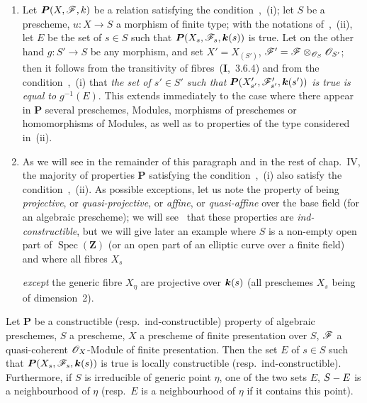 \begin{remarks}[9.2.2]
\begin{enumerate}[label=(\roman*)]
  \item Let $\boldsymbol{P}(X,\mathscr{F},k)$ be a relation satisfying the condition~,~(i); let $S$ be a prescheme, $u:X\to S$ a morphism of finite type; with the notations of~,~(ii), let $E$ be the set of $s\in S$ such that $\boldsymbol{P}(X_s,\mathscr{F}_s,\boldsymbol{k}(s))$ is true.
Let on the other hand $g:S'\to S$ be any morphism, and set $X'=X_{(S')}$, $\mathscr{F}'=\mathscr{F}\otimes_{\mathscr{O}_S}\mathscr{O}_{S'}$; then it follows from the transitivity of fibres~(\textbf{I},~3.6.4) and from the condition~,~(i) that \emph{the set of $s'\in S'$ such that $\boldsymbol{P}(X'_{s'},\mathscr{F}'_{s'},\boldsymbol{k}(s'))$ is true is equal to $g^{-1}(E)$}.
This extends immediately to the case where there appear in $\boldsymbol{P}$ several preschemes, Modules, morphisms of preschemes or homomorphisms of Modules, as well as to properties of the type considered in~(ii).

  \item As we will see in the remainder of this paragraph and in the rest of chap.~IV, the majority of properties $\boldsymbol{P}$ satisfying the condition~,~(i) also satisfy the condition~,~(ii).
As possible exceptions, let us note the property of being \emph{projective}, or \emph{quasi-projective}, or \emph{affine}, or \emph{quasi-affine} over the base field (for an algebraic prescheme); we will see~ that these properties are \emph{ind-constructible}, but we will give later an example where $S$ is a non-empty open part of $\operatorname{Spec}(\mathbf{Z})$ (or an open part of an elliptic curve over a finite field) and where all fibres $X_s$

\emph{except} the generic fibre $X_\eta$ are projective over $\boldsymbol{k}(s)$ (all preschemes $X_s$ being of dimension~2).
\end{enumerate}
\end{remarks}

\begin{proposition}[9.2.3]
\label{IV.9.2.3}
Let $\boldsymbol{P}$ be a constructible \textnormal{(resp.}\ ind-constructible\textnormal{)} property of algebraic preschemes, $S$ a prescheme, $X$ a prescheme of finite presentation over $S$, $\mathscr{F}$ a quasi-coherent $\mathscr{O}_X$-Module of finite presentation.
Then the set $E$ of $s\in S$ such that $\boldsymbol{P}(X_s,\mathscr{F}_s,\boldsymbol{k}(s))$ is true is locally constructible \textnormal{(resp.}\ ind-constructible\textnormal{)}.
Furthermore, if $S$ is irreducible of generic point $\eta$, one of the two sets $E$, $S- E$ is a neighbourhood of $\eta$ \textnormal{(resp.}\ $E$ is a neighbourhood of $\eta$ if it contains this point\textnormal{)}.
\end{proposition}

